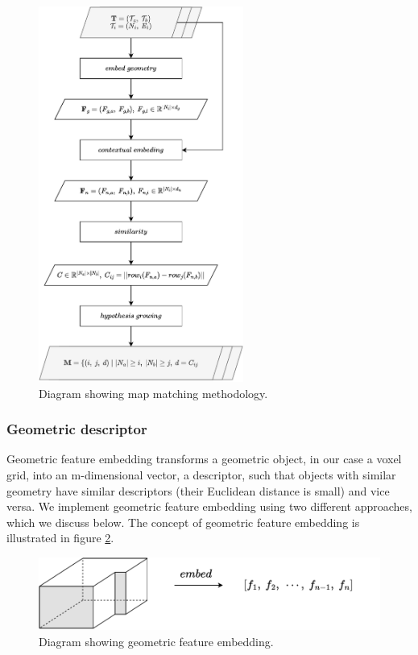 \begin{figure}[h]
    \centering
    \includegraphics*[width=0.6\textwidth]{./fig/flowchart_complete-Map match.drawio.pdf}
    \caption{Diagram showing map matching methodology.}
    \label{fig:flowchart_match}
\end{figure}

\pagebreak

\subsubsection{Geometric descriptor}
Geometric feature embedding transforms a geometric object, in our case a voxel grid, into an m-dimensional vector, a descriptor, such that objects with similar geometry have similar descriptors (their Euclidean distance is small) and vice versa. We implement geometric feature embedding using two different approaches, which we discuss below. The concept of geometric feature embedding is illustrated in figure \ref{fig:geometric_embedding}.

\begin{figure}[h]
    \centering
    \includegraphics*[width=.8\textwidth]{./fig/embed_geometry.pdf}
    \caption{Diagram showing geometric feature embedding.}
    \label{fig:geometric_embedding}
\end{figure}

